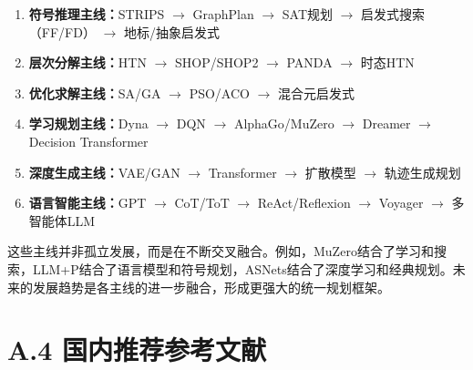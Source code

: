 \begin{enumerate}
  \item \textbf{符号推理主线：}STRIPS $\rightarrow$ GraphPlan $\rightarrow$ SAT规划 $\rightarrow$ 启发式搜索（FF/FD） $\rightarrow$ 地标/抽象启发式
  \item \textbf{层次分解主线：}HTN $\rightarrow$ SHOP/SHOP2 $\rightarrow$ PANDA $\rightarrow$ 时态HTN
  \item \textbf{优化求解主线：}SA/GA $\rightarrow$ PSO/ACO $\rightarrow$ 混合元启发式
  \item \textbf{学习规划主线：}Dyna $\rightarrow$ DQN $\rightarrow$ AlphaGo/MuZero $\rightarrow$ Dreamer $\rightarrow$ Decision Transformer
  \item \textbf{深度生成主线：}VAE/GAN $\rightarrow$ Transformer $\rightarrow$ 扩散模型 $\rightarrow$ 轨迹生成规划
  \item \textbf{语言智能主线：}GPT $\rightarrow$ CoT/ToT $\rightarrow$ ReAct/Reflexion $\rightarrow$ Voyager $\rightarrow$ 多智能体LLM
\end{enumerate}

这些主线并非孤立发展，而是在不断交叉融合。例如，MuZero结合了学习和搜索，LLM+P结合了语言模型和符号规划，ASNets结合了深度学习和经典规划。未来的发展趋势是各主线的进一步融合，形成更强大的统一规划框架。

\section*{A.4 国内推荐参考文献}

